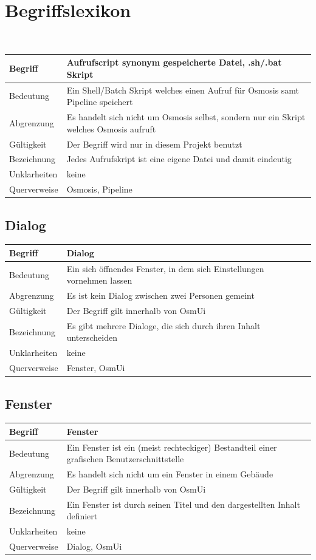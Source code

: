 \documentclass[a4paper,12pt]{scrartcl}
\begin{document}
\section{Begriffslexikon}
\begin{center}
\ \\
\begin{tabular}{|p{5cm}|p{10cm}|}
\hline Begriff & \textbf{Aufrufscript} synonym gespeicherte Datei, .sh/.bat Skript\\ 
\hline Bedeutung & Ein Shell/Batch Skript welches einen Aufruf für Osmosis samt Pipeline speichert \\
\hline Abgrenzung & Es handelt sich nicht um Osmosis selbst, sondern nur ein Skript welches Osmosis aufruft \\ 
\hline Gültigkeit &  Der Begriff wird nur in diesem Projekt benutzt \\ 
\hline Bezeichnung &  Jedes Aufrufskript ist eine eigene Datei und damit eindeutig\\ 
\hline Unklarheiten &  keine \\ 
\hline Querverweise &  Osmosis, Pipeline\\ 
\hline 
\end{tabular}
\subsection{Dialog}
\begin{tabular}{|p{5cm}|p{10cm}|}
\hline Begriff & \textbf{Dialog}\\ 
\hline Bedeutung & Ein sich öffnendes Fenster, in dem sich Einstellungen vornehmen lassen \\ 
\hline Abgrenzung & Es ist kein Dialog zwischen zwei Personen gemeint\\ 
\hline Gültigkeit & Der Begriff gilt innerhalb von OsmUi \\ 
\hline Bezeichnung & Es gibt mehrere Dialoge, die sich durch ihren Inhalt unterscheiden \\ 
\hline Unklarheiten & keine \\ 
\hline Querverweise & Fenster, OsmUi \\ 
\hline
\end{tabular}
\subsection{Fenster}
\begin{tabular}{|p{5cm}|p{10cm}|}
\hline Begriff & \textbf{Fenster}\\ 
\hline Bedeutung & Ein Fenster ist ein (meist rechteckiger) Bestandteil einer grafischen Benutzerschnittstelle \\ 
\hline Abgrenzung & Es handelt sich nicht um ein Fenster in einem Gebäude\\ 
\hline Gültigkeit & Der Begriff gilt innerhalb von OsmUi\\ 
\hline Bezeichnung & Ein Fenster ist durch seinen Titel und den dargestellten Inhalt definiert \\ 
\hline Unklarheiten & keine \\ 
\hline Querverweise & Dialog, OsmUi \\ 
\hline
\end{tabular}

\end{center}
\end{document}
